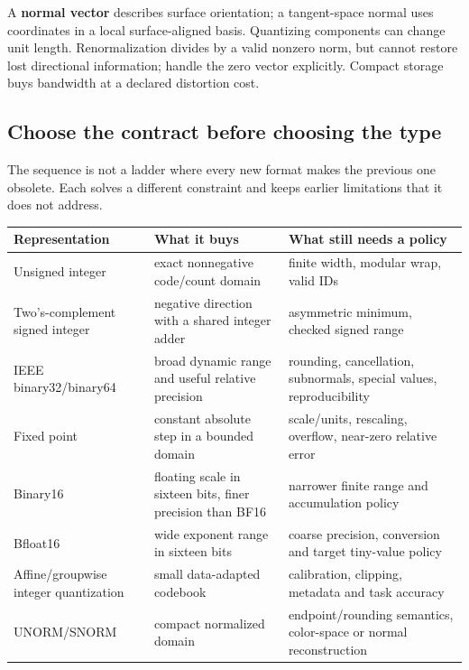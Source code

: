 A \textbf{normal vector} describes surface orientation; a tangent-space normal uses coordinates in a local surface-aligned basis. Quantizing components can change unit length. Renormalization divides by a valid nonzero norm, but cannot restore lost directional information; handle the zero vector explicitly. Compact storage buys bandwidth at a declared distortion cost.

\subsection{Choose the contract before choosing the type}\label{05-engine-i-ch001-choose-the-contract-before-choosing-the-type}

The sequence is not a ladder where every new format makes the previous one obsolete. Each solves a different constraint and keeps earlier limitations that it does not address.

{\def\LTcaptype{none} %
\begin{longtable}[]{@{}
  >{\raggedright\arraybackslash}p{}
  >{\raggedright\arraybackslash}p{}
  >{\raggedright\arraybackslash}p{}@{}}
\toprule\noalign{}
\begin{minipage}[b]{\linewidth}\raggedright
Representation
\end{minipage} & \begin{minipage}[b]{\linewidth}\raggedright
What it buys
\end{minipage} & \begin{minipage}[b]{\linewidth}\raggedright
What still needs a policy
\end{minipage} \\
\midrule\noalign{}
\endhead
\bottomrule\noalign{}
\endlastfoot
Unsigned integer & exact nonnegative code/count domain & finite width, modular wrap, valid IDs \\
Two's-complement signed integer & negative direction with a shared integer adder & asymmetric minimum, checked signed range \\
IEEE binary32/binary64 & broad dynamic range and useful relative precision & rounding, cancellation, subnormals, special values, reproducibility \\
Fixed point & constant absolute step in a bounded domain & scale/units, rescaling, overflow, near-zero relative error \\
Binary16 & floating scale in sixteen bits, finer precision than BF16 & narrower finite range and accumulation policy \\
Bfloat16 & wide exponent range in sixteen bits & coarse precision, conversion and target tiny-value policy \\
Affine/groupwise integer quantization & small data-adapted codebook & calibration, clipping, metadata and task accuracy \\
UNORM/SNORM & compact normalized domain & endpoint/rounding semantics, color-space or normal reconstruction \\
\end{longtable}
}

